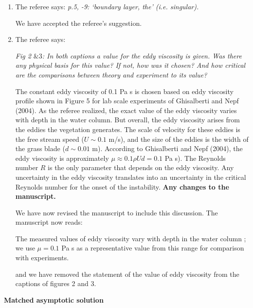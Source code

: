 \documentclass[letterpaper,10pt]{article}
\newcommand{\Rey}{{R}}
\newcommand{\revise}[1]{{\color{blue} {#1}}}
\begin{document}
\begin{enumerate}
\item The referee says:
\textit{
p.5, -9: `boundary layer, the' (i.e. singular).
}

We have accepted the referee's suggestion.

\item The referee says:

\textit{  Fig 2 $\& 3$:
In both captions a value for the eddy viscosity is given. Was there any physical basis for this value? If not, how was it chosen? And how critical are the comparisons between theory and experiment to its value?
}

The constant eddy viscosity of 0.1 Pa s is chosen based on eddy viscosity profile shown in Figure 5 for lab scale experiments of Ghisalberti and Nepf (2004). As the referee realized, the exact value of the eddy viscosity varies with depth in the water column. But overall, the eddy viscosity arises from the eddies the vegetation generates. The scale of velocity for these eddies is the free stream speed ($U \sim 0.1$ m/s), and the size of the eddies is the width of the grass blade ($d \sim 0.01$ m). According to Ghisalberti and Nepf (2004), the eddy viscosity is approximately $\mu \approx 0.1 \rho U d = 0.1$ Pa s). The Reynolds number $\Rey$ is the only parameter that depends on the eddy viscosity. Any uncertainty in the eddy viscosity translates into an uncertainty in the critical Reynolds number for the onset of the instability. {\bf Any changes to the manuscript.}

We have now revised the manuscript to include this discussion. The manuscript now reads:

\revise{
The measured values of eddy viscosity vary with depth in the water column \citep{Nepf04}; we use $\mu= 0.1$ Pa s as a representative value from this range for comparison with experiments.
}

and we have removed the statement of the value of eddy viscosity from the captions of figures 2 and 3.

\end{enumerate}

\newpage
\centerline{\large \textbf{Matched asymptotic solution}}
~\vspace{1mm}
\end{document}

